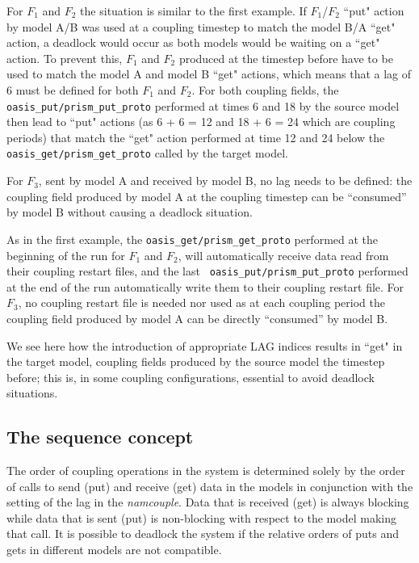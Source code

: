\begin{enumerate}
  For $F_1$ and $F_2$ the situation is similar to the first
  example. If $F_1$/$F_2$ ``put" action by model A/B was used at a
  coupling timestep to match the model B/A ``get" action, a
  deadlock would occur as both models would be waiting on a ``get"
  action. To prevent this, $F_1$ and $F_2$ produced at the timestep
  before have to be used to match the model A and model B ``get"
  actions, which means that a lag of 6 must be defined for both $F_1$
  and $F_2$. For both coupling fields, the {\tt oasis\_put/prism\_put\_proto}
  performed at times 6 and 18 by the source model then lead to ``put"
  actions (as 6 + 6 = 12 and 18 + 6 = 24 which are coupling periods)
  that match the ``get" action performed at time 12 and 24 below
  the {\tt oasis\_get/prism\_get\_proto} called by the target model.

  For $F_3$, sent by model A and received by model B, no lag
  needs to be defined: the coupling field produced by model A at the
  coupling timestep can be ``consumed'' by model B without causing a
  deadlock situation.

  As in the first example, the {\tt oasis\_get/prism\_get\_proto} performed at
  the beginning of the run for $F_1$ and $F_2$, will automatically receive data read from their coupling restart files, and the last {\tt
  oasis\_put/prism\_put\_proto} performed at the end of the run automatically
  write them to their coupling restart file. For $F_3$, no coupling
  restart file is needed nor used as at each coupling period the
  coupling field produced by model A can be directly ``consumed'' by
  model B.

  We see here how the introduction of appropriate LAG indices results in
  ``get" in the target model,
  coupling fields produced by the
  source model the timestep before; this is, in some coupling
  configurations, essential to avoid deadlock situations.

  \end{enumerate}

\vspace{-0.3cm}
\subsection{The sequence concept}
\label{subsec_sec}

The order of coupling operations in the system is determined solely
by the order of calls to send (put) and receive (get) data in the models
in conjunction with the setting of the lag in the {\it namcouple}.  Data that is
received (get) is always blocking while data that is sent (put) is non-blocking
with respect to the model making that call.  It is possible
to deadlock the system if the relative orders of puts and gets in different
models are not compatible. 

